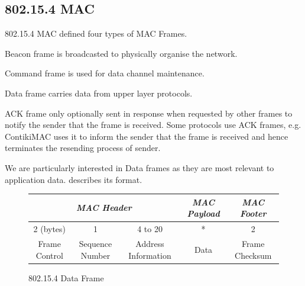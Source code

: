 \subsection{802.15.4 MAC} \label{Subsec: 802.15.4 MAC}
802.15.4 MAC defined four types of MAC Frames.
\begin{description}[style=nextline]
	\item[\textbf{Beacon}] 
	Beacon frame is broadcasted to physically organise the network.
	\item[\textbf{Command}] 
	Command frame is used for data channel maintenance.
	\item[\textbf{Data}] 
	Data frame carries data from upper layer protocols.
	\item[\textbf{ACK}] 
	ACK frame only optionally sent in response when requested by other frames to notify the sender that the frame is received. Some protocols use ACK frames, e.g. ContikiMAC uses it to inform the sender that the frame is received and hence terminates the resending process of sender.
\end{description}

We are particularly interested in Data frames as they are most relevant to application data.  describes its format.

\begin{figure}[h!]
	\centering
	\begin{tabular}{|c|c|c|c|c|}
		\multicolumn{3}{c}{\textit{MAC Header}}                           & \multicolumn{1}{c}{\textit{MAC Payload}} & \multicolumn{1}{c}{\textit{MAC Footer}}     \\ \hline
		2 (bytes)     & 1                    & 4 to 20              & *           & 2              \\ \hline
		Frame Control & Sequence Number & Address Information & Data        & Frame Checksum \\ \hline
	\end{tabular}
	\caption{802.15.4 Data Frame}
	\label{Fig: 802154 Data Frame}
\end{figure}

